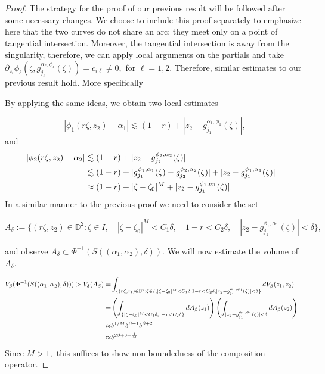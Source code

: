 \documentclass[10pt,a4paper]{amsart}
\begin{document}
\begin{proof} The strategy for the proof of our previous result will be followed after some necessary changes. We choose to include this proof separately to emphasize here that the two curves do not share an arc; they meet only on a point of tangential intersection. Moreover, the tangential intersection is away from the singularity, therefore, we can apply local arguments on the partials and take $\partial_{z_i}\phi_{\ell}(\zeta,g_{j_\ell}^{\alpha_{\ell},\phi_{\ell}}(\zeta))=c_{i\ell}\neq0,$ for $\ell=1,2.$ Therefore, similar estimates to our previous result hold. More specifically

By applying the same ideas, we obtain two local estimates

$$|\phi_1(r\zeta,z_2)-\alpha_1|\lesssim (1-r)+|z_2-g^{\alpha_1,\phi_1}_{j_1}(\zeta)|,$$
and
\begin{align}
|\phi_2(r\zeta,z_2)-\alpha_2|&\lesssim (1-r)+|z_2-g^{\phi_2,\alpha_2}_{j_2}(\zeta)| \notag&&\\
&\lesssim(1-r)+|g_{j_1}^{\phi_1,\alpha_1}(\zeta)-g_{j_2}^{\phi_2,\alpha_2}(\zeta)|+|z_2-g_{j_1}^{\phi_1,\alpha_1}(\zeta)|\notag&&\\
&\approx (1-r)+|\zeta-\zeta_0|^M+|z_2-g^{\phi_1,\alpha_1}_{j_1}(\zeta)|
.\end{align}
In a similar manner to the previous proof we need to consider the set

$$A_{\delta}:=\Bigg\{(r\zeta,z_2)\in\mathbb{D}^2:\zeta\in I,\quad|\zeta-\zeta_0|^M<C_1\delta,\quad 1-r<C_2\delta, \quad|z_2-g_{j_1}^{\phi_1,\alpha_1}(\zeta)|<\delta\Bigg\},$$

and observe $A_{\delta}\subset \Phi^{-1}(S((\alpha_1,\alpha_2),\delta)).$
We will now estimate the volume of $A_{\delta}.$

\begin{align}
V_{\beta}(\Phi^{-1}(S((\alpha_1,\alpha_2),\delta)))>V_{\delta}(A_{\beta})=&\int_{\{(r\zeta,z_1)\in\mathbb{D}^2:\zeta\in I,|\zeta-\zeta_0|^M<C_1\delta,1-r<C_2\delta, |z_2-g^{\alpha_1,\phi_1}_{j_1}(\zeta)|<\delta\}}dV_{\beta}(z_1,z_2)\notag&&\\
=&\left(\int_{\{|\zeta-\zeta_0|^M<C_1\delta,1-r<C_2\delta\}}dA_{\beta}(z_1)\right)\left(\int_{|z_2-g^{\alpha_1,\phi_1}_{j_1}(\zeta)|<\delta}dA_{\beta}(z_2)\right)\notag&&\\
\approx &\delta^{1/M}\delta^{\beta+1}\delta^{\beta+2}&&\\
\approx &\delta^{2\beta+3+\frac{1}{M}} \notag
\end{align}
Since $M>1,$ this suffices to show non-boundedness of the composition operator.
\end{proof}
\end{document}
